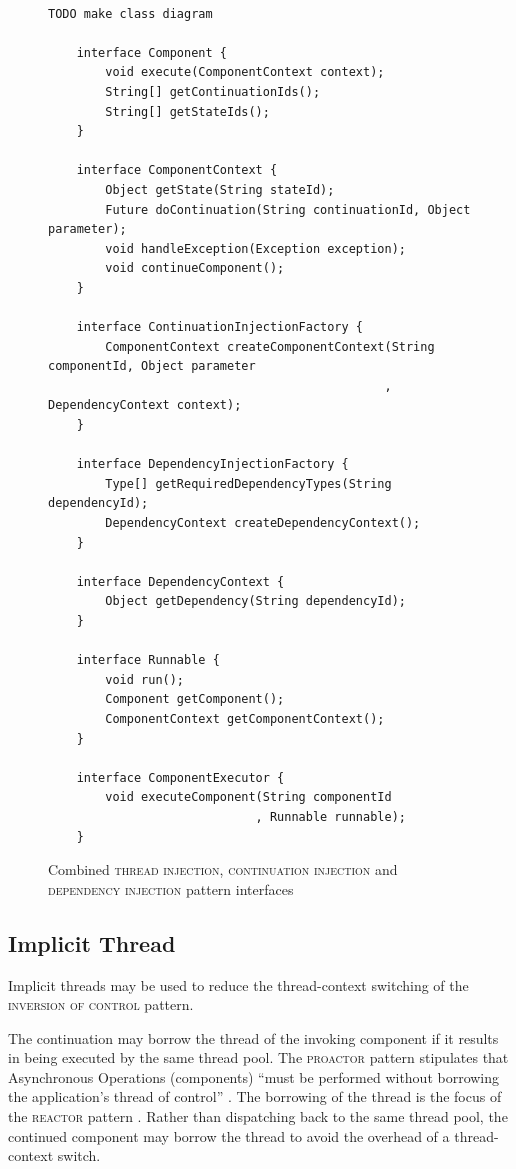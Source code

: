 \documentclass[prodmode]{style/acmlarge}
\begin{document}
\begin{figure}[tp]
\centering
\begin{verbatim}

TODO make class diagram

    interface Component {
        void execute(ComponentContext context);
        String[] getContinuationIds();
        String[] getStateIds();
    }

    interface ComponentContext {
        Object getState(String stateId);
        Future doContinuation(String continuationId, Object parameter);
        void handleException(Exception exception);
        void continueComponent();
    }
    
    interface ContinuationInjectionFactory {
        ComponentContext createComponentContext(String componentId, Object parameter
                                               , DependencyContext context);
    }
    
    interface DependencyInjectionFactory {
        Type[] getRequiredDependencyTypes(String dependencyId);
        DependencyContext createDependencyContext();
    }
    
    interface DependencyContext {
        Object getDependency(String dependencyId);
    }
    
    interface Runnable {
        void run();
        Component getComponent();
        ComponentContext getComponentContext();
    }

    interface ComponentExecutor {
        void executeComponent(String componentId 
                             , Runnable runnable);
    }
\end{verbatim}
\caption{Combined \textsc{thread injection}, \textsc{continuation injection} and \textsc{dependency injection} pattern interfaces\footnotemark}
\label{fig:IocInjectionInterfaces}
\end{figure}


\subsection{Implicit Thread}

Implicit threads may be used to reduce the thread-context switching of the
\textsc{inversion of control} pattern.

The continuation may borrow the thread of the invoking component if it results
in being executed by the same thread pool.  The \textsc{proactor} pattern
stipulates that Asynchronous Operations (components) ``must be performed without
borrowing the application's thread of control'' \cite[p. 8]{proactor}.  The
borrowing of the thread is the focus of the \textsc{reactor} pattern
\cite{reactor}.  Rather than dispatching back to the same thread pool, the
continued component may borrow the thread to avoid the overhead of a
thread-context switch.
\end{document}
